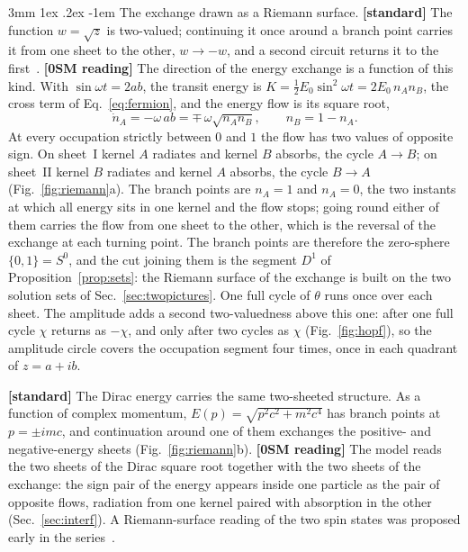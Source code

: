 \documentclass[%
 reprint, amsmath,amssymb, aps, prb, ]{revtex4-2}
\makeatletter
\numberwithin{equation}{section}
\renewcommand\paragraph{%
  \@startsection{paragraph}{4}{\z@}%
    {3mm \@plus 1ex \@minus .2ex}
    {-1em}
    {\normalfont\normalsize\itshape}}
\makeatother
\begin{document}
\paragraph{The exchange drawn as a Riemann surface.} \textbf{[standard]} The function $w=\sqrt{z}$ is two-valued; continuing it once around a branch point carries it from one sheet to the other, $w\to-w$, and a second circuit returns it to the first~\cite{ref:needham}. \textbf{[0SM reading]} The direction of the energy exchange is a function of this kind. With $\sin\omega t=2ab$, the transit energy is $K=\tfrac12E_0\sin^2\omega t=2E_0\,n_An_B$, the cross term of Eq.~\eqref{eq:fermion}, and the energy flow is its square root,
\begin{equation}
\dot n_A=-\omega\,ab=\mp\,\omega\sqrt{n_An_B},\qquad n_B=1-n_A .
\label{eq:flowroot}
\end{equation}
At every occupation strictly between $0$ and $1$ the flow has two values of opposite sign. On sheet~I kernel $A$ radiates and kernel $B$ absorbs, the cycle $A\to B$; on sheet~II kernel $B$ radiates and kernel $A$ absorbs, the cycle $B\to A$ (Fig.~\ref{fig:riemann}a). The branch points are $n_A=1$ and $n_A=0$, the two instants at which all energy sits in one kernel and the flow stops; going round either of them carries the flow from one sheet to the other, which is the reversal of the exchange at each turning point. The branch points are therefore the zero-sphere $\{0,1\}=S^0$, and the cut joining them is the segment $D^1$ of Proposition~\ref{prop:sets}: the Riemann surface of the exchange is built on the two solution sets of Sec.~\ref{sec:twopictures}. One full cycle of $\theta$ runs once over each sheet. The amplitude adds a second two-valuedness above this one: after one full cycle $\chi$ returns as $-\chi$, and only after two cycles as $\chi$ (Fig.~\ref{fig:hopf}), so the amplitude circle covers the occupation segment four times, once in each quadrant of $z=a+ib$.

\textbf{[standard]} The Dirac energy carries the same two-sheeted structure. As a function of complex momentum, $E(p)=\sqrt{p^2c^2+m^2c^4}$ has branch points at $p=\pm imc$, and continuation around one of them exchanges the positive- and negative-energy sheets (Fig.~\ref{fig:riemann}b). \textbf{[0SM reading]} The model reads the two sheets of the Dirac square root together with the two sheets of the exchange: the sign pair of the energy appears inside one particle as the pair of opposite flows, radiation from one kernel paired with absorption in the other (Sec.~\ref{sec:interf}). A Riemann-surface reading of the two spin states was proposed early in the series~\cite{ref:p3}.
\end{document}
